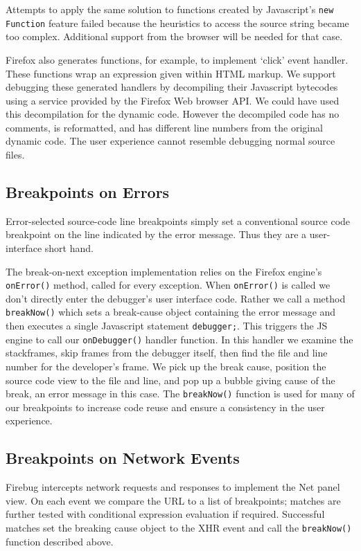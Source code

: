 \documentclass{www2010-accepted}
\begin{document}
Attempts to apply the same solution to functions created by
Javascript's \texttt{new Function} feature failed because the heuristics to
access the source string became too complex. Additional support from
the browser will be needed for that case.

Firefox also generates functions, for example, to implement `click'
event handler.  These functions wrap an expression given within HTML
markup.  We support debugging these generated handlers by decompiling
their Javascript bytecodes using a service provided by the Firefox Web
browser API. We could have used this decompilation for the dynamic
code. However the decompiled code has no comments, is reformatted, and
has different line numbers from the original dynamic code. The user
experience cannot resemble debugging normal source files.


\subsection{Breakpoints on Errors}

Error-selected source-code line breakpoints simply set a conventional
source code breakpoint on the line indicated by the error
message. Thus they are a user-interface short hand.

The break-on-next exception
implementation relies on the Firefox engine's \texttt{onError()}
method, called for every exception. When \texttt{onError()} is called
we don't directly enter the debugger's user interface code. Rather we
call a method \texttt{breakNow()} which sets a break-cause object
containing the error message and then executes a single Javascript
statement \texttt{debugger;}. This triggers the JS engine to call our
\texttt{onDebugger()} handler function. In this handler we examine the
stackframes, skip frames from the debugger itself, then find the file
and line number for the developer's frame. We pick up the break cause,
position the source code view to the file and line, and pop up a
bubble giving cause of the break, an error message in this case.  The
\texttt{breakNow()} function is used for many of our breakpoints to
increase code reuse and ensure a consistency in the user experience.


\subsection{Breakpoints on Network Events}

Firebug intercepts network requests and responses to implement the Net
panel view. On each event we compare the URL to a list of breakpoints;
matches are further tested with conditional expression evaluation if
required. Successful matches set the breaking cause object to the XHR
event and call the \texttt{breakNow()} function described above.
\end{document}
